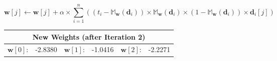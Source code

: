 \documentclass[xcolor={table}]{beamer}
\begin{document}
\begin{frame}
\begin{equation*}
	\mathbf{w}[j] \leftarrow \mathbf{w}[j] + \alpha \times \sum_{i=1}^{n} \left(\left(t_i - \mathbb{M}_{\mathbf{w}}(\mathbf{d}_i)\right) \times  \mathbb{M}_{\mathbf{w}}(\mathbf{d}_i) \times (1 - \mathbb{M}_{\mathbf{w}}(\mathbf{d}_i)) \times \mathbf{d}_i[j]\right)
\end{equation*}
\begin{center}
\begin{footnotesize}
\begin{tabular}{c c c c c c}
			\multicolumn{6}{c}{\textbf{New Weights (after Iteration 2)}} \\
			\hline
			$\mathbf{w}[0]$: &	-2.8380	& 	$\mathbf{w}[1]$:	&	-1.0416	 & $\mathbf{w}[2]$: &	-2.2271 \\
			\hline
	\end{tabular}
\end{footnotesize}
\end{center}
\end{frame}
\end{document}
